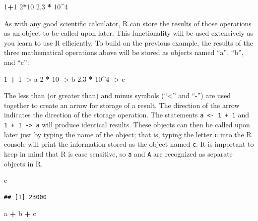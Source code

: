 \documentclass[letterpaper,]{book}
\newenvironment{Shaded}{\begin{snugshade}}{\end{snugshade}}
\newcommand{\DecValTok}[1]{\textcolor[rgb]{0.00,0.00,0.81}{#1}}
\newcommand{\FloatTok}[1]{\textcolor[rgb]{0.00,0.00,0.81}{#1}}
\newcommand{\NormalTok}[1]{#1}
\newcommand{\OperatorTok}[1]{\textcolor[rgb]{0.81,0.36,0.00}{\textbf{#1}}}
\newcommand{\StringTok}[1]{\textcolor[rgb]{0.31,0.60,0.02}{#1}}
\begin{document}
\begin{Shaded}
\begin{Highlighting}[]
\DecValTok{1}\OperatorTok{+}\DecValTok{1}
\DecValTok{2}\OperatorTok{*}\DecValTok{10}
\FloatTok{2.3} \OperatorTok{*}\StringTok{ }\DecValTok{10}\OperatorTok{^}\DecValTok{4}
\end{Highlighting}
\end{Shaded}

As with any good scientific calculator, R can store the results of those operations as an object to be called upon later. This functionality will be used extensively as you learn to use R efficiently. To build on the previous example, the results of the three mathematical operations above will be stored as objects named ``a'', ``b'', and ``c'':

\begin{Shaded}
\begin{Highlighting}[]
\DecValTok{1} \OperatorTok{+}\StringTok{ }\DecValTok{1}\NormalTok{ ->}\StringTok{ }\NormalTok{a}
\DecValTok{2} \OperatorTok{*}\StringTok{ }\DecValTok{10}\NormalTok{ ->}\StringTok{ }\NormalTok{b}
\FloatTok{2.3} \OperatorTok{*}\StringTok{ }\DecValTok{10}\OperatorTok{^}\DecValTok{4}\NormalTok{ ->}\StringTok{ }\NormalTok{c}
\end{Highlighting}
\end{Shaded}

The less than (or greater than) and minus symbols (``\textless{}'' and ``-'') are used together to create an arrow for storage of a result. The direction of the arrow indicates the direction of the storage operation. The statements \texttt{a\ \textless{}-\ 1\ +\ 1} and \texttt{1\ +\ 1\ -\textgreater{}\ a} will produce identical results. These objects can then be called upon later just by typing the name of the object; that is, typing the letter \texttt{c} into the R console will print the information stored as the object named \texttt{c}. It is important to keep in mind that R is case sensitive, so \texttt{a} and \texttt{A} are recognized as separate objects in R.

\begin{Shaded}
\begin{Highlighting}[]
\NormalTok{c}
\end{Highlighting}
\end{Shaded}

\begin{verbatim}
## [1] 23000
\end{verbatim}

\begin{Shaded}
\begin{Highlighting}[]
\NormalTok{a }\OperatorTok{+}\StringTok{ }\NormalTok{b }\OperatorTok{+}\StringTok{ }\NormalTok{c}
\end{Highlighting}
\end{Shaded}
\end{document}
